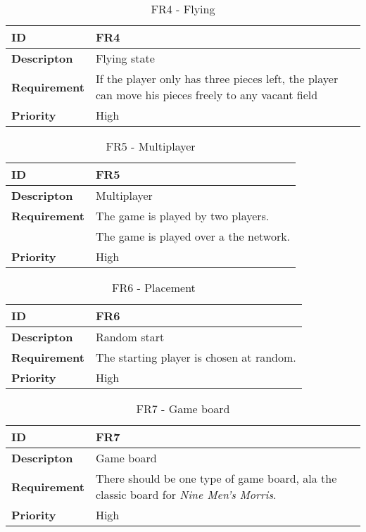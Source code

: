 \begin{table}[h!]
\begin{tabular}{ | p{90pt} | p{270pt}  |}
\hline
\bf ID &  FR4  \\ \hline
\bf Descripton & Flying state \\ \hline 
\bf Requirement & If the player only has three pieces left, the player can move his pieces freely to any vacant field \\ \hline
\bf Priority & High \\ \hline

\end{tabular}
\caption{FR4 - Flying}
\end{table}

\begin{table}[h!]
\begin{tabular}{ | p{90pt} | p{270pt}  |}
\hline
\bf ID &  FR5  \\ \hline
\bf Descripton & Multiplayer \\ \hline 
\bf Requirement & The game is played by two players.  \\   
& The game is played over a the network. \\  \hline
\bf Priority & High \\ \hline

\end{tabular}
\caption{FR5 - Multiplayer}
\end{table}

\begin{table}[h!]
\begin{tabular}{ | p{90pt} | p{270pt}  |}
\hline
\bf ID &  FR6  \\ \hline
\bf Descripton & Random start \\ \hline 
\bf Requirement & The starting player is chosen at random. \\ \hline
\bf Priority & High \\ \hline

\end{tabular}
\caption{FR6 - Placement}
\end{table}

\begin{table}[h!]
\begin{tabular}{ | p{90pt} | p{270pt}  |}
\hline
\bf ID &  FR7  \\ \hline
\bf Descripton & Game board \\ \hline 
\bf Requirement & There should be one type of game board, ala the classic board for \emph{Nine Men's Morris}.\\ \hline
\bf Priority & High \\ \hline

\end{tabular}
\caption{FR7 - Game board}
\end{table}

